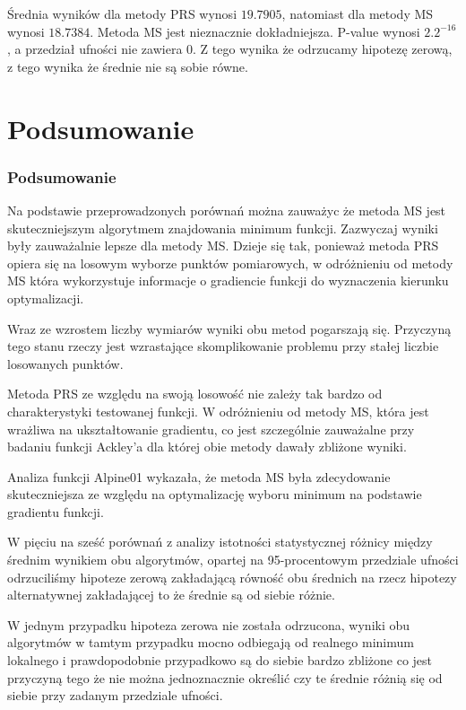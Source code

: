 \documentclass{lab}
\begin{document}
Średnia wyników dla metody PRS wynosi $19.7905$, natomiast dla metody MS wynosi $18.7384$. Metoda MS jest nieznacznie dokładniejsza. P-value wynosi $2.2^{-16}$, a przedział ufności nie zawiera 0. Z tego wynika że odrzucamy hipotezę zerową, z tego wynika że średnie nie są sobie równe.

\newpage
\part{Podsumowanie}
\section{Podsumowanie}
Na podstawie przeprowadzonych porównań można zauważyc że metoda MS jest skuteczniejszym algorytmem znajdowania minimum funkcji. Zazwyczaj wyniki były zauważalnie lepsze dla metody MS. Dzieje się tak, ponieważ metoda PRS opiera się na losowym wyborze punktów pomiarowych, w odróżnieniu od metody MS która wykorzystuje informacje o gradiencie funkcji do wyznaczenia kierunku optymalizacji.
\par
Wraz ze wzrostem liczby wymiarów wyniki obu metod pogarszają się. Przyczyną tego stanu rzeczy jest wzrastające skomplikowanie problemu przy stałej liczbie losowanych punktów.
\newline\par
Metoda PRS ze względu na swoją losowość nie zależy tak bardzo od charakterystyki testowanej funkcji. W odróżnieniu od metody MS, która jest wrażliwa na ukształtowanie gradientu, co jest szczególnie zauważalne przy badaniu funkcji Ackley'a dla której obie metody  dawały zbliżone wyniki. 
\par
Analiza funkcji Alpine01 wykazała, że metoda MS była zdecydowanie skuteczniejsza ze względu na optymalizację wyboru minimum na podstawie gradientu funkcji.
\newline\par
W pięciu na sześć porównań z analizy istotności statystycznej różnicy między średnim wynikiem obu algorytmów, opartej na 95-procentowym przedziale ufności odrzuciliśmy hipoteze zerową zakładającą równość obu średnich na rzecz hipotezy alternatywnej zakładającej to że średnie są od siebie różnie.
\par
W jednym przypadku hipoteza zerowa nie została odrzucona, wyniki obu algorytmów w tamtym przypadku mocno odbiegają od realnego minimum lokalnego i prawdopodobnie przypadkowo są do siebie bardzo zbliżone co jest przyczyną tego że nie można jednoznacznie określić czy te średnie różnią się od siebie przy zadanym przedziale ufności.
\end{document}
